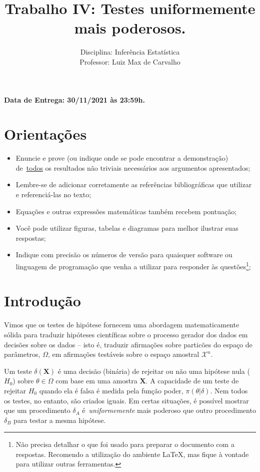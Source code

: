 \documentclass[a4paper,10pt, notitlepage]{report}
\title{Trabalho IV: Testes uniformemente mais poderosos.}
\author{Disciplina: Inferência Estatística \\ Professor: Luiz Max de Carvalho}
\newcommand{\bX}{\boldsymbol{X}} %
\begin{document}
\maketitle

\textbf{Data de Entrega: 30/11/2021 às 23:59h.}

\section*{Orientações}
\begin{itemize}
 \item Enuncie e prove (ou indique onde se pode encontrar a demonstração) de~\underline{todos} os resultados não triviais necessários aos argumentos apresentados;
 \item Lembre-se de adicionar corretamente as referências bibliográficas que utilizar e referenciá-las no texto;
 \item Equações e outras expressões matemáticas também recebem pontuação;
 \item Você pode utilizar figuras, tabelas e diagramas para melhor ilustrar suas respostas;
 \item Indique com precisão os números de versão para quaisquer software ou linguagem de programação que venha a utilizar para responder às questões\footnote{Não precisa detalhar o que foi usado para preparar o documento com a respostas. Recomendo a utilização do ambiente LaTeX, mas fique à vontade para utilizar outras ferramentas.};
 \end{itemize}


\section*{Introdução}

Vimos que os testes de hipótese fornecem uma abordagem matematicamente sólida para traduzir hipóteses científicas sobre o processo gerador dos dados em decisões sobre os dados -- isto é, traduzir afirmações sobre particões do espaço de parâmetros, $\Omega$, em afirmações testáveis sobre o espaço amostral $\mathcal{X}^n$.

Um teste $\delta(\bX)$ é uma decisão (binária) de rejeitar ou não uma hipótese nula ($H_0$) sobre $\theta \in \Omega$ com base em uma amostra $\bX$.
A capacidade de um teste de rejeitar $H_0$ quando ela é falsa é medida pela função poder, $\pi(\theta |\delta)$.
Nem todos os testes, no entanto, são criados iguais.
Em certas situações, é possível mostrar que um procedimento $\delta_A$ é~\textit{uniformemente} mais poderoso que outro procedimento $\delta_B$ para testar a mesma hipótese.
\end{document}
